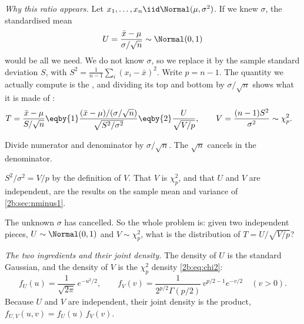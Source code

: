 \emph{Why this ratio appears.} Let $x_1,\dots,x_n\iid\Normal(\mu,\sigma^2)$. If we
knew $\sigma$, the standardised mean
\begin{equation*}
  U=\frac{\bar x-\mu}{\sigma/\sqrt n}\sim\Normal(0,1)
\end{equation*}
would be all we need. We do not know $\sigma$, so we replace it by the sample
standard deviation $S$, with $S^2=\frac1{n-1}\sum_i(x_i-\bar x)^2$. Write $p=n-1$.
The quantity we actually compute is the , and dividing its
top and bottom by $\sigma/\sqrt n$ shows what it is made of
:
\begin{align}
  T=\frac{\bar x-\mu}{S/\sqrt n}
  &\eqby{1} \frac{(\bar x-\mu)/(\sigma/\sqrt n)}{\sqrt{S^2/\sigma^2}}
   \eqby{2} \frac{U}{\sqrt{V/p}},
  \qquad V=\frac{(n-1)S^2}{\sigma^2}\sim\chi^2_p .
  \label{2b:eq:t-ratio}
\end{align}
\begin{explain}
  \item Divide numerator and denominator by $\sigma/\sqrt n$. The $\sqrt n$ cancels in the denominator.
  \item $S^2/\sigma^2=V/p$ by the definition of $V$. That $V$ is $\chi^2_p$, and that $U$ and $V$ are independent, are the results on the sample mean and variance of \cref{2b:sec:nminus1}.
\end{explain}
The unknown $\sigma$ has cancelled. So the whole problem is: given two independent
pieces, $U\sim\Normal(0,1)$ and $V\sim\chi^2_p$, what is the distribution of
$T=U/\sqrt{V/p}$?

\emph{The two ingredients and their joint density.} The density of $U$ is the standard
Gaussian, and the density of $V$ is the $\chi^2_p$ density \eqref{2b:eq:chi2}:
\begin{equation}
  f_U(u)=\frac{1}{\sqrt{2\pi}}\,e^{-u^2/2},
  \qquad
  f_V(v)=\frac{1}{2^{p/2}\Gamma(p/2)}\,v^{p/2-1}e^{-v/2}\quad(v>0).
  \label{2b:eq:t-ingredients}
\end{equation}
Because $U$ and $V$ are independent, their joint density is the product,
$f_{U,V}(u,v)=f_U(u)\,f_V(v)$.

